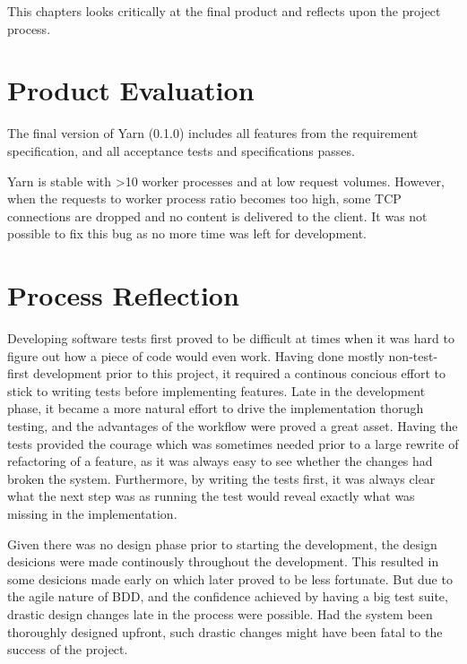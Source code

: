 This chapters looks critically at the final product and reflects upon the
project process.

\section{Product Evaluation}
The final version of Yarn (0.1.0) includes all features from the requirement
specification, and all acceptance tests and specifications passes. 

Yarn is stable with \textgreater 10 worker processes and at low request
volumes. However, when the requests to worker process ratio becomes too high,
some TCP connections are dropped and no content is delivered to the client.
It was not possible to fix this bug as no more time was left for
development.

\section{Process Reflection}
Developing software tests first proved to be difficult at times when it was
hard to figure out how a piece of code would even work. Having done mostly
non-test-first development prior to this project, it required a continous
concious effort to stick to writing tests before implementing features. Late
in the development phase, it became a more natural effort to drive the
implementation thorugh testing, and the advantages of the workflow were proved
a great asset. Having the tests provided the courage which was sometimes
needed prior to a large rewrite of refactoring of a feature, as it was always
easy to see whether the changes had broken the system. Furthermore, by writing
the tests first, it was always clear what the next step was as running the
test would reveal exactly what was missing in the implementation.

Given there was no design phase prior to starting the development, the design
desicions were made continously throughout the development. This resulted in
some desicions made early on which later proved to be less fortunate. But due
to the agile nature of BDD, and the confidence achieved by having a big test
suite, drastic design changes late in the process were possible. Had the
system been thoroughly designed upfront, such drastic changes might have been
fatal to the success of the project.
